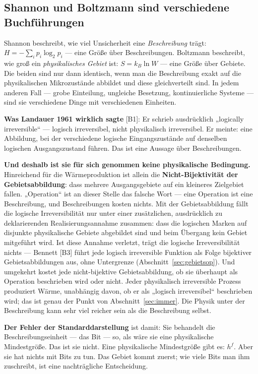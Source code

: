 \subsection{Shannon und Boltzmann sind verschiedene Buchführungen}

\LB [B18][B19] Shannon beschreibt, wie viel Unsicherheit eine \emph{Beschreibung}
trägt: $H = -\sum_i p_i \log_2 p_i$ --- eine Größe über Beschreibungen. Boltzmann
beschreibt, wie groß ein \emph{physikalisches Gebiet} ist: $S = k_B \ln W$ ---
eine Größe über Gebiete. Die beiden sind nur dann identisch, wenn man die
Beschreibung exakt auf die physikalischen Mikrozustände abbildet und diese
gleichverteilt sind. In jedem anderen Fall --- grobe Einteilung, ungleiche
Besetzung, kontinuierliche Systeme --- sind sie verschiedene Dinge mit
verschiedenen Einheiten.

\LK \textbf{Was Landauer 1961 wirklich sagte} [B1]: Er schrieb ausdrücklich
„logically irreversible“ --- logisch irreversibel, nicht physikalisch
irreversibel. Er meinte: eine Abbildung, bei der verschiedene logische
Eingangszustände auf denselben logischen Ausgangszustand führen. Das ist eine
Aussage über Beschreibungen.

\LB \textbf{Und deshalb ist sie für sich genommen keine physikalische Bedingung.}
Hinreichend für die Wärmeproduktion ist allein die \textbf{Nicht-Bijektivität der
Gebietsabbildung}: dass mehrere Ausgangsgebiete auf ein kleineres Zielgebiet
fallen. „Operation“ ist an dieser Stelle das falsche Wort --- eine Operation ist
eine Beschreibung, und Beschreibungen kosten nichts. Mit der Gebietsabbildung
fällt die logische Irreversibilität nur unter einer zusätzlichen, ausdrücklich zu
deklarierenden Realisierungsannahme zusammen: dass die logischen Marken auf
disjunkte physikalische Gebiete abgebildet sind und beim Übergang kein Gebiet
mitgeführt wird. Ist diese Annahme verletzt, trägt die logische Irreversibilität
nichts --- Bennett [B3] führt jede logisch irreversible Funktion als Folge
bijektiver Gebietsabbildungen aus, ohne Untergrenze
(Abschnitt~\ref{sec:gebietsop}). Und umgekehrt kostet jede nicht-bijektive
Gebietsabbildung, ob sie überhaupt als Operation beschrieben wird oder nicht.
Jeder physikalisch irreversible Prozess produziert Wärme, unabhängig davon, ob er
als „logisch irreversibel“ beschrieben wird; das ist genau der Punkt von
Abschnitt~\ref{sec:immer}. Die Physik unter der Beschreibung kann sehr viel
reicher sein als die Beschreibung selbst.

\LB \textbf{Der Fehler der Standarddarstellung} ist damit: Sie behandelt die
Beschreibungseinheit --- das Bit --- so, als wäre sie eine physikalische
Mindestgröße. Das ist sie nicht. Eine physikalische Mindestgröße gibt es: $h^f$.
Aber sie hat nichts mit Bits zu tun. Das Gebiet kommt zuerst; wie viele Bits man
ihm zuschreibt, ist eine nachträgliche Entscheidung.

